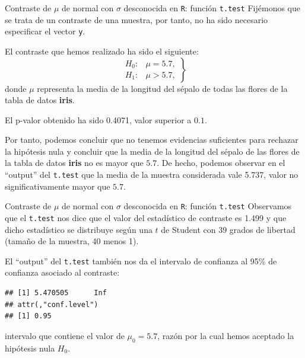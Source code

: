 \documentclass[
  ignorenonframetext,
]{beamer}
\newenvironment{Shaded}{\begin{snugshade}}{\end{snugshade}}
\newcommand{\DataTypeTok}[1]{\textcolor[rgb]{0.13,0.29,0.53}{#1}}
\newcommand{\FloatTok}[1]{\textcolor[rgb]{0.00,0.00,0.81}{#1}}
\newcommand{\KeywordTok}[1]{\textcolor[rgb]{0.13,0.29,0.53}{\textbf{#1}}}
\newcommand{\NormalTok}[1]{#1}
\newcommand{\OperatorTok}[1]{\textcolor[rgb]{0.81,0.36,0.00}{\textbf{#1}}}
\newcommand{\StringTok}[1]{\textcolor[rgb]{0.31,0.60,0.02}{#1}}
\begin{document}
\begin{frame}[fragile]{Contraste de \(\mu\) de normal con \(\sigma\)
desconocida en \texttt{R}: función \texttt{t.test}}
\protect\hypertarget{contraste-de-mu-de-normal-con-sigma-desconocida-en-r-funciuxf3n-t.test-6}{}
Fijémonos que se trata de un contraste de una muestra, por tanto, no ha
sido necesario especificar el vector \texttt{y}.

El contraste que hemos realizado ha sido el siguiente: \[
\left.
\begin{array}{ll}
H_0: & \mu =5.7, \\
H_1: & \mu > 5.7,
\end{array}
\right\}
\] donde \(\mu\) representa la media de la longitud del sépalo de todas
las flores de la tabla de datos \textbf{iris}.

El p-valor obtenido ha sido 0.4071, valor superior a \(0.1\).

Por tanto, podemos concluir que no tenemos evidencias suficientes para
rechazar la hipótesis nula y concluir que la media de la longitud del
sépalo de las flores de la tabla de datos \textbf{iris} no es mayor que
\(5.7\). De hecho, podemos observar en el ``output'' del \texttt{t.test}
que la media de la muestra considerada vale 5.737, valor no
significativamente mayor que \(5.7\).
\end{frame}

\begin{frame}[fragile]{Contraste de \(\mu\) de normal con \(\sigma\)
desconocida en \texttt{R}: función \texttt{t.test}}
\protect\hypertarget{contraste-de-mu-de-normal-con-sigma-desconocida-en-r-funciuxf3n-t.test-7}{}
Observamos que el \texttt{t.test} nos dice que el valor del estadístico
de contraste es 1.499 y que dicho estadístico se distribuye según una
\(t\) de Student con \(39\) grados de libertad (tamaño de la muestra, 40
menos 1).

El ``output'' del \texttt{t.test} también nos da el intervalo de
confianza al 95\% de confianza asociado al contraste:

\begin{Shaded}
\end{Shaded}

\begin{verbatim}
## [1] 5.470505      Inf
## attr(,"conf.level")
## [1] 0.95
\end{verbatim}

intervalo que contiene el valor de \(\mu_0 =5.7\), razón por la cual
hemos aceptado la hipótesis nula \(H_0\).
\end{frame}
\end{document}
